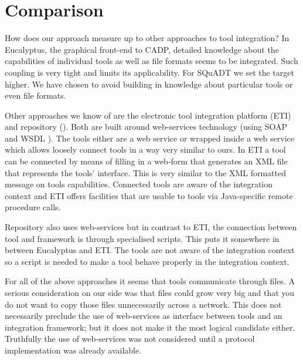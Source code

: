 \documentclass{article}
\newcommand{\squadt}{SQuADT\xspace}
\begin{document}

  \section{Comparison}
  
   How does our approach measure up to other approaches to tool integration?  In
   Eucalyptus, the graphical front-end to CADP, detailed knowledge about the
   capabilities of individual tools as well as file formats seems to be
   integrated. Such coupling is very tight and limits its applicability. For
   \squadt we set the target higher. We have chosen to avoid building in
   knowledge about particular tools or even file formats.
   
   Other approaches we know of are the electronic tool integration platform
   (ETI) \cite{RICVT} and repository (\cite{SFAV}). Both are built around
   web-services technology (using SOAP \cite{SOAP} and WSDL \cite{2001-WSDL}).
   The tools either are a web service or wrapped inside a web service which
   allows loosely connect tools in a way very similar to ours. In ETI a tool
   can be connected by means of filling in a web-form that generates an XML
   file that represents the tools' interface.  This is very similar to the XML
   formatted message on tools capabilities. Connected tools are aware of the
   integration context and ETI offers facilities that are usable to tools via
   Java-specific remote procedure calls.
   
   Repository also uses web-services but in contrast to ETI, the connection
   between tool and framework is through specialised scripts. This puts it
   somewhere in between Eucalyptus and ETI. The tools are not aware of the
   integration context so a script is needed to make a tool behave properly in
   the integration context.
 
   For all of the above approaches it seems that tools communicate through
   files.  A serious consideration on our side was that files could grow very
   big and that you do not want to copy those files unnecessarily across a
   network. This does not necessarily preclude the use of web-services as
   interface between tools and an integration framework; but it does not make
   it the most logical candidate either. Truthfully the use of web-services was
   not considered until a protocol implementation was already available.
\end{document}
